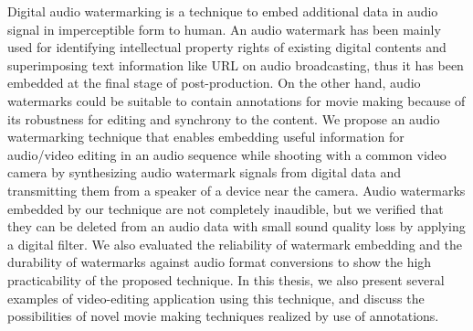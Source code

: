 \begin{eabstract}
Digital audio watermarking is a technique to embed additional data in audio signal in imperceptible form to human.
An audio watermark has been mainly used for identifying intellectual property rights of existing digital contents and superimposing text information like URL on audio broadcasting, thus it has been embedded at the final stage of post-production.
On the other hand, audio watermarks could be suitable to contain annotations for movie making because of its robustness for editing and synchrony to the content.
We propose an audio watermarking technique that enables embedding useful information for audio/video editing in an audio sequence while shooting with a common video camera by synthesizing audio watermark signals from digital data and transmitting them from a speaker of a device near the camera.
Audio watermarks embedded by our technique are not completely inaudible, but we verified that they can be deleted from an audio data with small sound quality loss by applying a digital filter.
We also evaluated the reliability of watermark embedding and the durability of watermarks against audio format conversions to show the high practicability of the proposed technique.
In this thesis, we also present several examples of video-editing application using this technique, and discuss the possibilities of novel movie making techniques realized by use of annotations.
\end{eabstract}
